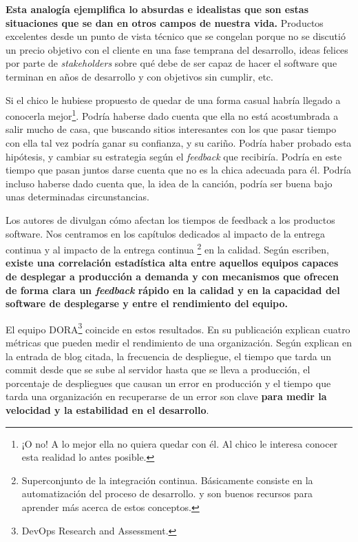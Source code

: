 \textbf{Esta analogía ejemplifica lo absurdas e idealistas
que son estas situaciones que se dan en otros campos de nuestra vida.}
Productos excelentes desde un punto de vista técnico que se
congelan porque no se discutió un precio objetivo con
el cliente en una fase temprana del desarrollo, ideas felices
por parte de \textit{stakeholders} sobre qué debe de
ser capaz de hacer el software que terminan en años de desarrollo
y con objetivos sin cumplir, etc.

Si el chico le hubiese propuesto de quedar de una forma casual
habría llegado a conocerla mejor\footnote{¡O no! A lo mejor ella no
quiera quedar con él. Al chico le interesa
conocer esta realidad lo antes posible.}. Podría haberse dado cuenta que
ella no está acostumbrada a salir mucho de casa, que buscando sitios
interesantes con los que pasar tiempo con ella tal vez podría ganar su
confianza, y su cariño. Podría haber probado esta hipótesis, y cambiar
su estrategia según el \textit{feedback} que recibiría. Podría en este tiempo que
pasan juntos darse cuenta que no es la chica adecuada para él. Podría
incluso haberse dado cuenta que, la idea de la canción, podría ser buena
bajo unas determinadas circunstancias.

Los autores de \cite{accelerate} divulgan cómo afectan los tiempos de feedback
a los productos software. Nos centramos en los capítulos dedicados al impacto de
la entrega continua y al impacto de la entrega continua%
\footnote{%
Superconjunto de la integración continua. Básicamente consiste en la automatización
del proceso de desarrollo. \cite{ModernSoftwareEngineering} y \cite{minimumViableCD}
son buenos recursos para aprender más acerca de estos conceptos.%
}%
en la calidad. Según escriben, \textbf{existe una correlación estadística alta entre aquellos
equipos capaces de desplegar a producción a demanda y 
con mecanismos que ofrecen de forma clara un \textit{feedback} rápido en
la calidad y en la capacidad del software de desplegarse y entre el rendimiento del
equipo.}

El equipo DORA\footnote{DevOps Research and Assessment.} coincide en estos resultados.
En su publicación \cite{EliteDevOps} explican cuatro métricas que pueden medir el
rendimiento de una organización. Según explican en la entrada de blog citada,
la frecuencia de despliegue, el tiempo que tarda un commit desde que se sube
al servidor hasta que se lleva a producción,
el porcentaje de despliegues que causan un error en producción y el tiempo
que tarda una organización en recuperarse de un error son clave \textbf{para medir la
velocidad y la estabilidad en el desarrollo}.

